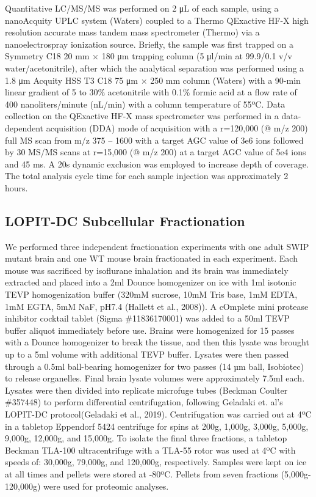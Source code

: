 Quantitative LC/MS/MS was performed on 2 μL of each sample, using a nanoAcquity
UPLC system (Waters) coupled to a Thermo QExactive HF-X high resolution accurate
mass tandem mass spectrometer (Thermo) via a nanoelectrospray ionization source.
Briefly, the sample was first trapped on a Symmetry C18 20 mm × 180 μm trapping
column (5 μl/min at 99.9/0.1 v/v water/acetonitrile), after which the analytical
separation was performed using a 1.8 μm Acquity HSS T3 C18 75 μm × 250 mm column
(Waters) with a 90-min linear gradient of 5 to 30\% acetonitrile with 0.1\%
formic acid at a flow rate of 400 nanoliters/minute (nL/min) with a column
temperature of 55ºC. Data collection on the QExactive HF-X mass spectrometer was
performed in a data-dependent acquisition (DDA) mode of acquisition with a
r=120,000 (@ m/z 200) full MS scan from m/z 375 – 1600 with a target AGC value
of 3e6 ions followed by 30 MS/MS scans at r=15,000 (@ m/z 200) at a target AGC
value of 5e4 ions and 45 ms. A 20s dynamic exclusion was employed to increase
depth of coverage. The total analysis cycle time for each sample injection was
approximately 2 hours. 

\subsection{LOPIT-DC Subcellular Fractionation}

We performed three independent fractionation experiments with one adult SWIP
mutant brain and one WT mouse brain fractionated in each experiment. Each mouse
was sacrificed by isoflurane inhalation and its brain was immediately extracted
and placed into a 2ml Dounce homogenizer on ice with 1ml isotonic TEVP
homogenization buffer (320mM sucrose, 10mM Tris base, 1mM EDTA, 1mM EGTA, 5mM
NaF, pH7.4 (Hallett et al., 2008)). A cOmplete mini protease inhibitor cocktail
tablet (Sigma \#11836170001) was added to a 50ml TEVP buffer aliquot immediately
before use. Brains were homogenized for 15 passes with a Dounce homogenizer to
break the tissue, and then this lysate was brought up to a 5ml volume with
additional TEVP buffer. Lysates were then passed through a 0.5ml ball-bearing
homogenizer for two passes (14 µm ball, Isobiotec) to release organelles. Final
brain lysate volumes were approximately 7.5ml each. Lysates were then divided
into replicate microfuge tubes (Beckman Coulter \#357448) to perform
differential centrifugation, following Geladaki et. al’s LOPIT-DC
protocol(Geladaki et al., 2019). Centrifugation was carried out at 4ºC in a
tabletop Eppendorf 5424 centrifuge for spins at 200g, 1,000g, 3,000g, 5,000g,
9,000g, 12,000g, and 15,000g. To isolate the final three fractions, a tabletop
Beckman TLA-100 ultracentrifuge with a TLA-55 rotor was used at 4ºC with speeds
of: 30,000g, 79,000g, and 120,000g, respectively. Samples were kept on ice at
all times and pellets were stored at -80ºC. Pellets from seven fractions
(5,000g-120,000g) were used for proteomic analyses. 

